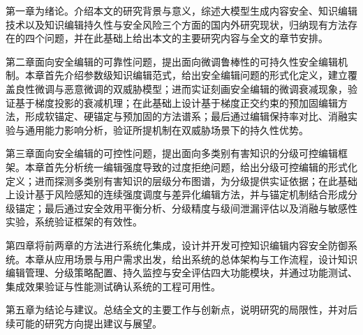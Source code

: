 第一章为绪论。介绍本文的研究背景与意义，综述大模型生成内容安全、知识编辑技术以及知识编辑持久性与安全风险三个方面的国内外研究现状，归纳现有方法存在的四个问题，并在此基础上给出本文的主要研究内容与全文的章节安排。

第二章面向安全编辑的可靠性问题，提出面向微调鲁棒性的可持久性安全编辑机制。本章首先介绍参数级知识编辑范式，给出安全编辑问题的形式化定义，建立覆盖良性微调与恶意微调的双威胁模型；进而实证刻画安全编辑的微调衰减现象，验证基于梯度投影的衰减机理；在此基础上设计基于梯度正交约束的预加固编辑方法，形成软锚定、硬锚定与预加固的方法谱系；最后通过编辑保持率对比、消融实验与通用能力影响分析，验证所提机制在双威胁场景下的持久性优势。

第三章面向安全编辑的可控性问题，提出面向多类别有害知识的分级可控编辑框架。本章首先分析统一编辑强度导致的过度拒绝问题，给出分级可控编辑的形式化定义；进而探测多类别有害知识的层级分布图谱，为分级提供实证依据；在此基础上设计基于风险感知的连续强度调度与差异化编辑方法，并与锚定机制结合形成分级锚定；最后通过安全效用平衡分析、分级精度与级间泄漏评估以及消融与敏感性实验，系统验证框架的有效性。

第四章将前两章的方法进行系统化集成，设计并开发可控知识编辑内容安全防御系统。本章从应用场景与用户需求出发，给出系统的总体架构与工作流程，设计知识编辑管理、分级策略配置、持久监控与安全评估四大功能模块，并通过功能测试、集成效果验证与性能测试确认系统的工程可用性。

第五章为结论与建议。总结全文的主要工作与创新点，说明研究的局限性，并对后续可能的研究方向提出建议与展望。
